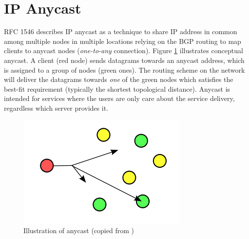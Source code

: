 

\section{IP Anycast}
\label{ch02:anycast}

RFC 1546 \cite{rfc1546} describes IP anycast as a technique to share IP address in common among multiple nodes in multiple locations relying on the BGP routing to map clients to anycast nodes (\textit{one-to-any} connection). Figure \ref{fig:anycast} illustrates conceptual anycast. A client (red node)  sends datagrams towards an anycast address, which is assigned to a group of nodes (green ones). The routing scheme on the network will deliver the datagrams towards \textit{one} of the green nodes which satisfies the best-fit requirement (typically the shortest topological distance). Anycast is intended for services where the users are only care about the service delivery, regardless which server provides it. 

\begin{figure}[ht!]
	\centering
	\includegraphics[scale=0.5]{img/anycast.png}
	\caption{Illustration of anycast (copied from \cite{wiki-anycast})}
	\label{fig:anycast}
\end{figure}

